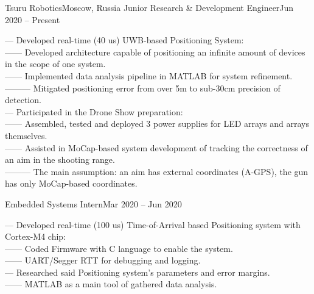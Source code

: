     \resumeSubheading
      {Tsuru Robotics}{Moscow, Russia}
      {Junior Research \& Development Engineer}{Jun 2020 -- Present}
      \begin{itemize}[leftmargin=0in, label={}]
            \small{\item{
                {— Developed real-time (40 us) UWB-based Positioning System:}\\
                {—— Developed architecture capable of positioning an infinite amount of devices in the scope of one system.}\\
                {—— Implemented data analysis pipeline in MATLAB for system refinement.}\\
                {——— Mitigated positioning error from over 5m to sub-30cm precision of detection.}\\
                {— Participated in the Drone Show preparation:}\\
                {—— Assembled, tested and deployed 3 power supplies for LED arrays and arrays themselves.}\\
                {—— Assisted in MoCap-based system development of tracking the correctness of an aim in the shooting range.}\\
                {——— The main assumption: an aim has external coordinates (A-GPS), the gun has only MoCap-based  coordinates.}
            }}
      \end{itemize}
    \resumeSubSubheading
    {Embedded Systems Intern}{Mar 2020 -- Jun 2020}
      \begin{itemize}[leftmargin=0in, label={}]
            \small{\item{
                {— Developed real-time (100 us) Time-of-Arrival based Positioning system with Cortex-M4 chip:}\\
                {—— Coded Firmware with C language to enable the system.}\\
                {—— UART/Segger RTT for debugging and logging.}\\
                {— Researched said Positioning system's parameters and error margins.}\\
                {—— MATLAB as a main tool of gathered data analysis.}
            }}
      \end{itemize}